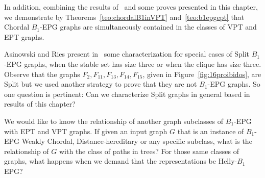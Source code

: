   In addition, combining the results of~\cite{alcon2014recognizing,Asinowski2009, golumbic2009} and some proves  presented in this chapter, we demonstrate by  Theorems~\ref{teo:chordalB1inVPT} and~\ref{teo:b1epgept} that Chordal $B_1$-EPG graphs are simultaneously contained in the classes of VPT and EPT graphs.  
 
 

Asinowski and Ries present in~\cite{ries2009} some characterization for special cases of Split $B_1$-EPG graphs, when the stable set has size three or when the clique has size three. Observe that the graphs $F_2, F_{11}, F_{13}, F_{14}, F_{15}$, given in Figure~\ref{fig:16proibidos}, are Split but we used another strategy to prove that they are not $B_1$-EPG graphs. So one question is pertinent: Can we characterize Split graphs in general based in results of this chapter? 

We would like to know the relationship of another graph subclasses of $B_1$-EPG with EPT and VPT graphs. If given an  input graph $G$ that is an instance of $B_1$-EPG  Weakly Chordal,  Distance-hereditary or any specific subclass, what is the relationship of $G$ with the class of paths in trees? For those same classes of graphs, what happens when we demand that the representations be Helly-$B_1$ EPG?

 
%




